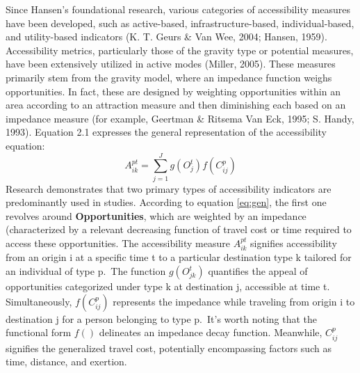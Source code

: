 \documentclass[12pt,twoside]{reedthesis}
\begin{document}
Since Hansen's foundational research, various categories of accessibility measures have been developed, such as active-based, infrastructure-based, individual-based, and utility-based indicators (K. T. Geurs \& Van Wee, 2004; Hansen, 1959). Accessibility metrics, particularly those of the gravity type or potential measures, have been extensively utilized in active modes (Miller, 2005). These measures primarily stem from the gravity model, where an impedance function weighs opportunities. In fact, these are designed by weighting opportunities within an area according to an attraction measure and then diminishing each based on an impedance measure (for example, Geertman \& Ritsema Van Eck, 1995; S. Handy, 1993). Equation 2.1 expresses the general representation of the accessibility equation:
\begin{equation}
A_{ik}^{pt} = \sum_{j=1}^J g(O_j^t) f(C_{ij}^p)
\label{eq:gen}
\end{equation}
Research demonstrates that two primary types of accessibility indicators are predominantly used in studies. According to equation \eqref{eq:gen}, the first one revolves around \textbf{Opportunities}, which are weighted by an impedance (characterized by a relevant decreasing function of travel cost or time required to access these opportunities. The accessibility measure \(A^ {pt}_{ik}\) signifies accessibility from an origin i at a specific time t to a particular destination type k tailored for an individual of type p.~The function \(g(O^t_{jk})\) quantifies the appeal of opportunities categorized under type k at destination j, accessible at time t. Simultaneously, \(f(C^p_{ij})\) represents the impedance while traveling from origin i to destination j for a person belonging to type p.~It's worth noting that the functional form \(f()\) delineates an impedance decay function. Meanwhile, \(C^p_{ij}\) signifies the generalized travel cost, potentially encompassing factors such as time, distance, and exertion.
\end{document}
